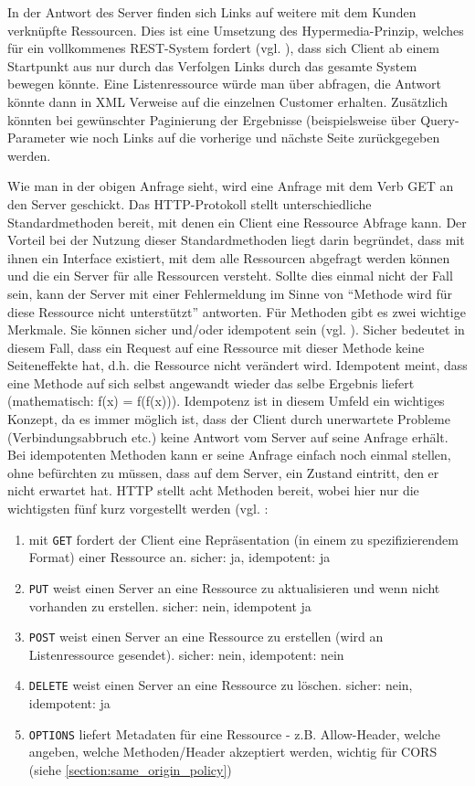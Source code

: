 In der Antwort des Server finden sich Links auf weitere mit dem Kunden verknüpfte Ressourcen. Dies ist eine Umsetzung des Hypermedia-Prinzip, welches für ein vollkommenes REST-System fordert (vgl. \cite{tilkovrestchapter2}), dass sich Client ab einem Startpunkt aus nur durch das Verfolgen Links durch das gesamte System bewegen könnte. Eine Listenressource würde man über  abfragen, die Antwort könnte dann in XML Verweise auf die einzelnen Customer erhalten. Zusätzlich könnten bei gewünschter Paginierung der Ergebnisse (beispielsweise über Query-Parameter wie  noch Links auf die vorherige und nächste Seite zurückgegeben werden.

Wie man in der obigen Anfrage sieht, wird eine Anfrage mit dem Verb GET an den Server geschickt. Das HTTP-Protokoll stellt unterschiedliche Standardmethoden bereit, mit denen ein Client eine Ressource Abfrage kann. Der Vorteil bei der Nutzung dieser Standardmethoden liegt darin begründet, dass mit ihnen ein Interface existiert, mit dem alle Ressourcen abgefragt werden können und die ein Server für alle Ressourcen versteht. Sollte dies einmal nicht der Fall sein, kann der Server mit einer Fehlermeldung im Sinne von "`Methode wird für diese Ressource nicht unterstützt"' antworten. Für Methoden gibt es zwei wichtige Merkmale. Sie können sicher und/oder idempotent sein (vgl. \cite{tilkovrestchapter5}). Sicher bedeutet in diesem Fall, dass ein Request auf eine Ressource mit dieser Methode keine Seiteneffekte hat, d.h. die Ressource nicht verändert wird. Idempotent meint, dass eine Methode auf sich selbst angewandt wieder das selbe Ergebnis liefert (mathematisch: f(x) = f(f(x))). Idempotenz ist in diesem Umfeld ein wichtiges Konzept, da es immer möglich ist, dass der Client durch unerwartete Probleme (Verbindungsabbruch etc.) keine Antwort vom Server auf seine Anfrage erhält. Bei idempotenten Methoden kann er seine Anfrage einfach noch einmal stellen, ohne befürchten zu müssen, dass auf dem Server, ein Zustand eintritt, den er nicht erwartet hat. HTTP stellt acht Methoden bereit, wobei hier nur die wichtigsten fünf kurz vorgestellt werden (vgl. \cite{tilkovrestchapter5}:
\begin{enumerate}
 \item mit \texttt{GET} fordert der Client eine Repräsentation (in einem zu spezifizierendem Format) einer Ressource an. sicher: ja, idempotent: ja
 \item \texttt{PUT} weist einen Server an eine Ressource zu aktualisieren und wenn nicht vorhanden zu erstellen. sicher: nein, idempotent ja 
 \item \texttt{POST} weist einen Server an eine Ressource zu erstellen (wird an Listenressource gesendet). sicher: nein, idempotent: nein
 \item \texttt{DELETE} weist einen Server an eine Ressource zu löschen. sicher: nein, idempotent: ja
 \item \texttt{OPTIONS} liefert Metadaten für eine Ressource - z.B. Allow-Header, welche angeben, welche Methoden/Header akzeptiert werden, wichtig für CORS (siehe \ref{section:same_origin_policy})
\end{enumerate}

